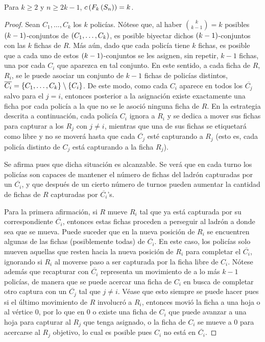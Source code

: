 \begin{teorema}
\label{teo:numero-de-policia-estrella}
    Para $k\geq 2$ y $n\geq 2k-1$, $c\left( F_{k}\left( S_{n}\right)\right)=k$.
\end{teorema}

\begin{proof}
    Sean $C_1,\dots, C_k$ los $k$ polic\'ias. N\'otese que, al haber
    $\binom{k}{k-1}=k$ posibles $\left( k-1\right)$-conjuntos de $\left( C_1,\dots, C_k\right)$, es
    posible biyectar dichos $\left( k-1\right)$-conjuntos con las $k$ fichas de $R$. M\'as
    a\'un, dado que cada polic\'ia tiene $k$ fichas, es posible que a cada uno
    de estos $\left( k-1\right)$-conjuntos se les asignen, sin repetir, $k-1$ fichas, una
    por cada $C_i$ que aparezca en tal conjunto. En este sentido, a cada ficha
    de $R$, $R_i$, se le puede asociar un conjunto de $k-1$ fichas de polic\'ias
    distintos, $\overline{C_i}=\left\{ C_1,\dots,C_k\right\}\setminus\left\{ C_i\right\}$. De este modo,
    como cada $C_i$ aparece en todos los $\overline{C_j}$ salvo para el $j=i$,
    entonces posterior a la asignaci\'on existe exactamente una ficha por cada
    polic\'ia a la que no se le asoci\'o ninguna ficha de $R$. En la estrategia
    descrita a continuaci\'on, cada polic\'ia $C_i$ ignora a $R_i$ y se dedica a
    mover sus fichas para capturar a los $R_j$ con $j\neq i$, mientras que una
    de sus fichas se etiquetar\'a como libre y no se mover\'a hasta que cada
    $\overline{C_j}$ est\'e capturando a $R_j$ (esto es, cada polic\'ia distinto
    de $C_j$ est\'a capturando a la ficha $R_j$).

    Se afirma pues que dicha situaci\'on es alcanzable. Se ver\'a que en cada
    turno los polic\'ias son capaces de mantener el n\'umero de fichas del
    ladr\'on capturadas por un $\overline{C_i}$, y que despu\'es de un cierto
    n\'umero de turnos pueden aumentar la cantidad de fichas de $R$ capturadas
    por $\overline{C_i}$'s.

    Para la primera afirmaci\'on, si $R$ mueve $R_i$ tal que ya est\'a capturada
    por su correspondiente $\overline{C_i}$, entonces estas fichas proceden a
    perseguir al ladr\'on a donde sea que se mueva. Puede suceder que en la
    nueva posici\'on de $R_i$ se encuentren algunas de las fichas (posiblemente
    todas) de $\overline{C_i}$. En este caso, los polic\'ias solo mueven
    aquellas que resten hacia la nueva posici\'on de $R_i$ para completar el
    $\overline{C_i}$, ignorando si $R_i$ al moverse paso a ser capturada por la
    ficha libre de $C_i$. N\'otese adem\'as que recapturar con $\overline{C_i}$
    representa un movimiento de a lo m\'as $k-1$ polic\'ias, de manera que se
    puede acercar una ficha de $C_i$ en busca de completar otro captura con un
    $\overline{C_j}$ tal que $j\neq i$. V\'ease que esto siempre se puede hacer
    pues si el \'ultimo movimiento de $R$ involucr\'o a $R_i$, entonces movi\'o
    la ficha a una hoja o al v\'ertice $0$, por lo que en $0$ o existe una ficha
    de $C_i$ que puede avanzar a una hoja para capturar al $R_j$ que tenga
    asignado, o la ficha de $C_i$ se mueve a $0$ para acercarse al $R_j$
    objetivo, lo cual es posible pues $C_i$ no est\'a en $\overline{C_i}$.
    

\end{proof}
